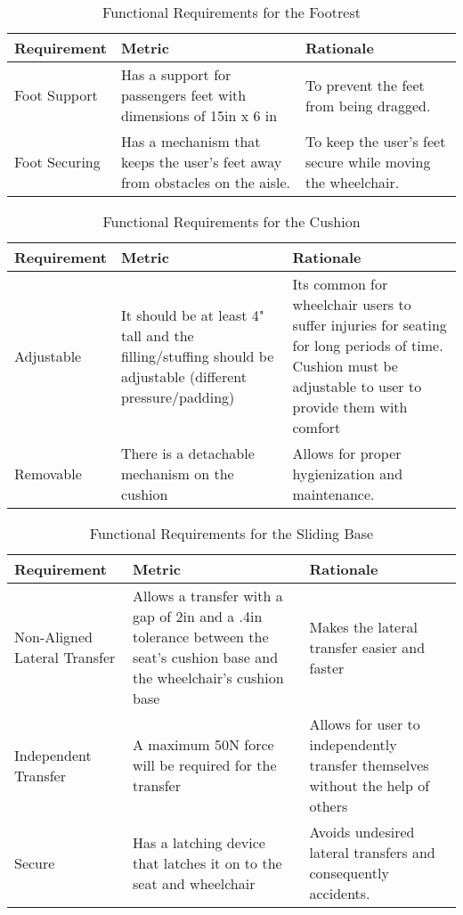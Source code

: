 \begin{table}
\begin{tabular} {| p{4cm} | p{5cm} | p{5cm} |}
\hline
\textbf{Requirement} & \textbf{Metric} & \textbf{Rationale} \\ \hline

Foot Support &  Has a support for passengers feet with dimensions of 15in x 6 in & To prevent the feet from being dragged. \\ \hline
Foot Securing & Has a mechanism that keeps the user's feet away from obstacles on the aisle. & To keep the user's feet secure while moving the wheelchair.  \\ \hline
\end{tabular} 
\caption{Functional Requirements for the Footrest}
\label{tab:functional_requirements_footrest}
\end{table}


\clearpage
\newpage


\begin{table}
\begin{tabular} {| p{4cm} | p{5cm} | p{5cm} |}
\hline
\textbf{Requirement} & \textbf{Metric} & \textbf{Rationale} \\ \hline

Adjustable & It should be at least 4" tall and the filling/stuffing should be adjustable (different pressure/padding)& Its common for wheelchair users to suffer injuries for seating for long periods of time. Cushion must be adjustable to user to provide them with comfort \\ \hline
Removable & There is a detachable mechanism on the cushion & Allows for proper hygienization and maintenance. \\ \hline
\end{tabular} 
\caption{Functional Requirements for the Cushion}
\label{tab:functional_requirements_cushion}
\end{table}


\begin{table}
\begin{tabular} {| p{4cm} | p{5cm} | p{5cm} |}
\hline
\textbf{Requirement} & \textbf{Metric} & \textbf{Rationale} \\ \hline
Non-Aligned Lateral Transfer & Allows a transfer with a gap of 2in and a .4in tolerance between the seat's cushion base and the wheelchair's cushion base & Makes the lateral transfer easier and faster  \\ \hline
Independent Transfer & A maximum 50N force will be required for the transfer & Allows for user to independently transfer themselves without the help of others  \\ \hline
Secure & Has a latching device that latches it on to the seat and wheelchair & Avoids undesired lateral transfers and consequently accidents. \\ \hline
\end{tabular} 
\caption{Functional Requirements for the Sliding Base}
\label{tab:functional_requirements_sliding}
\end{table}


